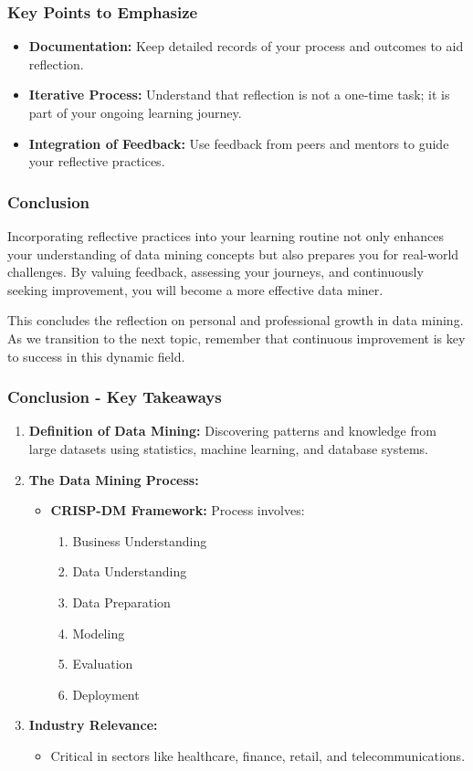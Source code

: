 \documentclass[aspectratio=169]{beamer}
\begin{document}
\begin{frame}[fragile]
    \frametitle{Key Points to Emphasize}
    \begin{itemize}
        \item \textbf{Documentation:} Keep detailed records of your process and outcomes to aid reflection.
        \item \textbf{Iterative Process:} Understand that reflection is not a one-time task; it is part of your ongoing learning journey.
        \item \textbf{Integration of Feedback:} Use feedback from peers and mentors to guide your reflective practices.
    \end{itemize}
\end{frame}

\begin{frame}[fragile]
    \frametitle{Conclusion}
    Incorporating reflective practices into your learning routine not only enhances your understanding of data mining concepts but also prepares you for real-world challenges. By valuing feedback, assessing your journeys, and continuously seeking improvement, you will become a more effective data miner. 

    This concludes the reflection on personal and professional growth in data mining. As we transition to the next topic, remember that continuous improvement is key to success in this dynamic field.
\end{frame}

\begin{frame}[fragile]
  \frametitle{Conclusion - Key Takeaways}
  \begin{enumerate}
    \item \textbf{Definition of Data Mining:} Discovering patterns and knowledge from large datasets using statistics, machine learning, and database systems.
    
    \item \textbf{The Data Mining Process:} 
    \begin{itemize}
      \item \textbf{CRISP-DM Framework:} Process involves: 
        \begin{enumerate}
          \item Business Understanding
          \item Data Understanding
          \item Data Preparation
          \item Modeling
          \item Evaluation
          \item Deployment
        \end{enumerate}
    \end{itemize}
    
    \item \textbf{Industry Relevance:}
    \begin{itemize}
      \item Critical in sectors like healthcare, finance, retail, and telecommunications.
    \end{itemize}
  \end{enumerate}
\end{frame}
\end{document}

